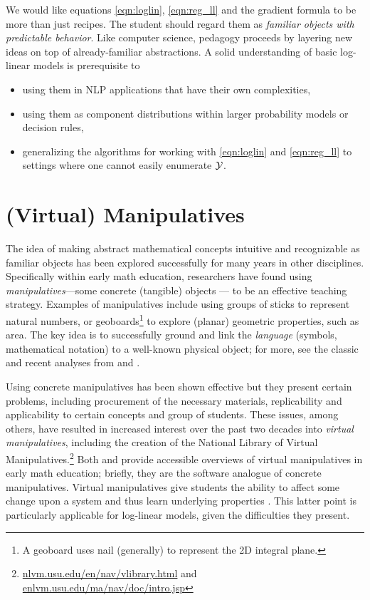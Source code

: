 \documentclass[11pt,letterpaper]{article}
\begin{document}
We would like equations \eqref{eqn:loglin}, \eqref{eqn:reg_ll} and the
gradient formula to be more than just recipes.  The student should
regard them as {\em familiar objects with predictable behavior}.  Like
computer science, pedagogy proceeds by layering new ideas on top of
already-familiar abstractions.  A solid understanding of basic
log-linear models is prerequisite to 
\begin{itemize}
\item using them in NLP applications that have their own complexities, 
\item using them as component distributions within larger probability
  models or decision rules,
\item generalizing the algorithms for working with \eqref{eqn:loglin}
  and \eqref{eqn:reg_ll} to settings where one cannot easily enumerate
  ${\cal Y}$.
\end{itemize}

\section{(Virtual) Manipulatives}
The idea of making abstract mathematical concepts intuitive and recognizable as familiar objects 
has been explored successfully for many years in other disciplines. Specifically within early 
math education, researchers have found using \textit{manipulatives}---some concrete (tangible) 
objects --- to be an effective teaching strategy. Examples of manipulatives include using groups of 
sticks to represent natural numbers, or geoboards\footnote{A geoboard uses nail (generally) to represent 
the 2D integral plane.} to explore (planar) geometric properties, such as area. The key idea is to 
successfully ground and link the \textit{language} (symbols, mathematical notation) to a well-known physical 
object; for more, see the classic and recent analyses from
 and .

Using concrete manipulatives has been shown effective but they present certain problems, including procurement 
of the necessary materials, replicability and applicability to certain concepts and group of students. These issues, among others, have 
resulted in increased interest over the past two decades into \textit{virtual manipulatives}, including the creation of 
the National Library of Virtual Manipulatives.\footnote{\url{nlvm.usu.edu/en/nav/vlibrary.html} and 
\url{enlvm.usu.edu/ma/nav/doc/intro.jsp}} 
Both  and  provide accessible overviews of 
virtual manipulatives in early math education; briefly, they are the software analogue of concrete manipulatives. Virtual manipulatives give students the 
ability to affect some change upon a system and thus learn underlying properties \cite{moyer2002virtual}.
This latter point is particularly applicable for log-linear models, given the difficulties they present.
\end{document}
